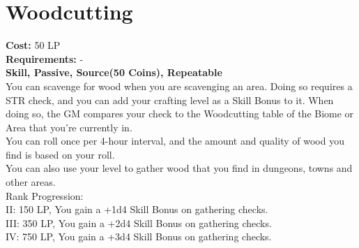 \section{Woodcutting}\label{perk:woodcutting}
\textbf{Cost:} 50 LP\\
\textbf{Requirements:} -\\
\textbf{Skill, Passive, Source(50 Coins), Repeatable}\\
You can scavenge for wood when you are scavenging an area.
Doing so requires a STR check, and you can add your crafting level as a Skill Bonus to it.
When doing so, the GM compares your check to the Woodcutting table of the Biome or Area that you're currently in.\\
You can roll once per 4-hour interval, and the amount and quality of wood you find is based on your roll.\\
You can also use your level to gather wood that you find in dungeons, towns and other areas.
\\
Rank Progression:\\
II: 150 LP, You gain a +1d4 Skill Bonus on gathering checks.\\
III: 350 LP, You gain a +2d4 Skill Bonus on gathering checks.\\
IV: 750 LP, You gain a +3d4 Skill Bonus on gathering checks.\\
